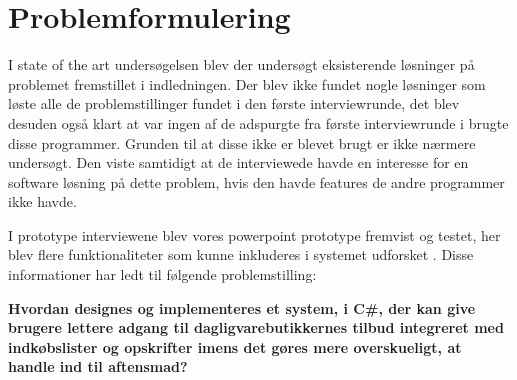 \section{Problemformulering}\label{section:problemformulering}

I state of the art undersøgelsen  blev der undersøgt eksisterende løsninger på problemet fremstillet i indledningen. 
Der blev ikke fundet nogle løsninger som løste alle de problemstillinger fundet i den første interviewrunde, det blev desuden også klart at var ingen af de adspurgte fra første interviewrunde i  brugte disse programmer.
Grunden til at disse ikke er blevet brugt er ikke nærmere undersøgt.
Den viste samtidigt at de interviewede havde en interesse for en software løsning på dette problem, hvis den havde  features de andre programmer ikke havde. 

I prototype interviewene blev vores powerpoint prototype fremvist og testet, her blev flere funktionaliteter som kunne inkluderes i systemet udforsket .
Disse informationer har ledt til følgende problemstilling:

\textbf{Hvordan designes og implementeres et system, i C\#, der kan give brugere lettere adgang til dagligvarebutikkernes tilbud integreret med indkøbslister og opskrifter imens det gøres mere overskueligt, at handle ind til aftensmad? }
